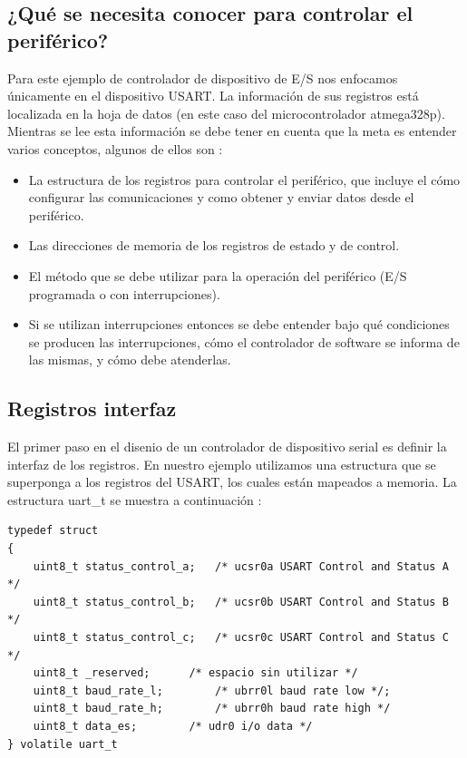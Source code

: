 \documentclass[output=paper, 
colorlinks,
citecolor=brown,
newtxmath
]{langscibook}
\begin{document}
\subsection*{¿Qué se necesita conocer para controlar el periférico?}
Para este ejemplo de controlador de dispositivo de E/S nos enfocamos únicamente
en el dispositivo USART. La información de sus registros está localizada en la hoja
de datos (en este caso del microcontrolador atmega328p). Mientras se lee esta información
se debe tener en cuenta que la meta es entender varios conceptos, algunos
de ellos son :
\begin{itemize}
\item La estructura de los registros para controlar el periférico, que incluye
el cómo configurar las comunicaciones y como obtener y enviar
datos desde el periférico.
\item Las direcciones de memoria de los registros de estado y de control.
\item El método que se debe utilizar para la operación del periférico (E/S 
programada o con interrupciones).
\item Si se utilizan interrupciones entonces se debe entender bajo qué condiciones
se producen las interrupciones, cómo el controlador de software se informa
de las mismas, y cómo debe atenderlas.
\end{itemize}

\subsection {Registros interfaz}

El primer paso en el disenio de un controlador de dispositivo serial es definir
la interfaz de los registros. En nuestro ejemplo utilizamos
una estructura que se superponga a los registros del USART, los cuales
están mapeados a memoria. La estructura uart\_t se muestra a continuación :


\begin{small}
\begin{verbatim}
typedef struct 
{
    uint8_t status_control_a;   /* ucsr0a USART Control and Status A */
    uint8_t status_control_b;   /* ucsr0b USART Control and Status B */
    uint8_t status_control_c;   /* ucsr0c USART Control and Status C */
    uint8_t _reserved;    	/* espacio sin utilizar */
    uint8_t baud_rate_l;    	/* ubrr0l baud rate low */;
    uint8_t baud_rate_h;    	/* ubrr0h baud rate high */
    uint8_t data_es;		/* udr0 i/o data */
} volatile uart_t
\end{verbatim}
\end{small}
\end{document}
